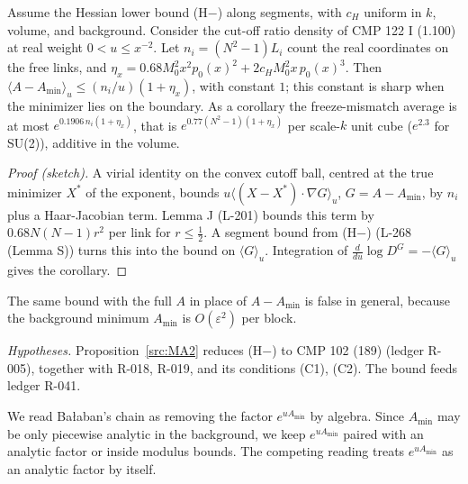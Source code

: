 \begin{proposition}\label{src:MA}
Assume the Hessian lower bound (H$-$) along segments, with $c_H$ uniform in $k$, volume, and background. Consider the cut-off ratio density of CMP 122 I (1.100) at real weight $0<u\le x^{-2}$. Let $n_i=(N^2-1)L_i$ count the real coordinates on the free links, and $\eta_x=0.68M_0^2x^2p_0(x)^2+2c_HM_0^2x\,p_0(x)^3$. Then $\langle A-A_{\min}\rangle_u\le(n_i/u)(1+\eta_x)$, with constant $1$; this constant is sharp when the minimizer lies on the boundary. As a corollary the freeze-mismatch average is at most $e^{0.1906\,n_i(1+\eta_x)}$, that is $e^{0.77(N^2-1)(1+\eta_x)}$ per scale-$k$ unit cube ($e^{2.3}$ for SU(2)), additive in the volume.
\end{proposition}
\begin{proof}[Proof (sketch)]
A virial identity on the convex cutoff ball, centred at the true minimizer $X^*$ of the exponent, bounds $u\langle(X-X^*)\cdot\nabla G\rangle_u$, $G=A-A_{\min}$, by $n_i$ plus a Haar-Jacobian term. Lemma J (L-201) bounds this term by $0.68N(N-1)r^2$ per link for $r\le\tfrac12$. A segment bound from (H$-$) (L-268 (Lemma S)) turns this into the bound on $\langle G\rangle_u$. Integration of $\tfrac{d}{du}\log D^G=-\langle G\rangle_u$ gives the corollary.
\end{proof}
\begin{remark}
The same bound with the full $A$ in place of $A-A_{\min}$ is false in general, because the background minimum $A_{\min}$ is $O(\varepsilon^2)$ per block.
\end{remark}
\emph{Hypotheses.} Proposition~\ref{src:MA2} reduces (H$-$) to CMP 102 (189) (ledger R-005), together with R-018, R-019, and its conditions (C1), (C2). The bound feeds ledger R-041.

\begin{convention}\label{conv:src-Amin}
We read Ba{\l}aban's chain as removing the factor $e^{uA_{\min}}$ by algebra. Since $A_{\min}$ may be only piecewise analytic in the background, we keep $e^{uA_{\min}}$ paired with an analytic factor or inside modulus bounds. The competing reading treats $e^{uA_{\min}}$ as an analytic factor by itself.
\end{convention}

